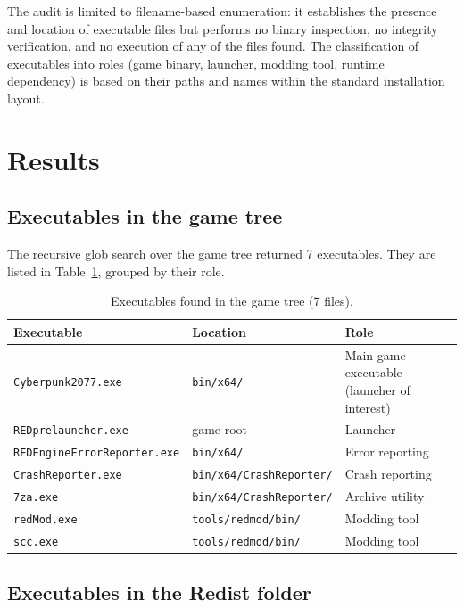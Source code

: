 \documentclass[11pt]{article}
\begin{document}
The audit is limited to filename-based enumeration: it establishes the
presence and location of executable files but performs no binary inspection,
no integrity verification, and no execution of any of the files found. The
classification of executables into roles (game binary, launcher, modding tool,
runtime dependency) is based on their paths and names within the standard
installation layout.

\section{Results}
\label{sec:results}

\subsection{Executables in the game tree}
\label{sec:game-tree}

The recursive glob search over the game tree returned 7 executables. They are
listed in Table~\ref{tab:game-tree}, grouped by their role.

\begin{table}[htbp]
\centering
\caption{Executables found in the game tree (7 files).}
\label{tab:game-tree}
\begin{tabular}{@{}lll@{}}
\toprule
\textbf{Executable} & \textbf{Location} & \textbf{Role} \\
\midrule
\texttt{Cyberpunk2077.exe} & \texttt{bin/x64/} & Main game executable (launcher of interest) \\
\texttt{REDprelauncher.exe} & game root & Launcher \\
\texttt{REDEngineErrorReporter.exe} & \texttt{bin/x64/} & Error reporting \\
\texttt{CrashReporter.exe} & \texttt{bin/x64/CrashReporter/} & Crash reporting \\
\texttt{7za.exe} & \texttt{bin/x64/CrashReporter/} & Archive utility \\
\texttt{redMod.exe} & \texttt{tools/redmod/bin/} & Modding tool \\
\texttt{scc.exe} & \texttt{tools/redmod/bin/} & Modding tool \\
\bottomrule
\end{tabular}
\end{table}

\subsection{Executables in the Redist folder}
\label{sec:redist}
\end{document}

